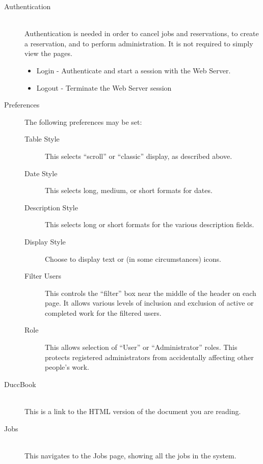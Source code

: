         \begin{description}
          \item[Authentication] \hfill \\ 
            Authentication is needed in order to cancel jobs and reservations, to create a
            reservation, and to perform administration. It is not required to simply view the pages.

            \begin{itemize}
              \item Login - Authenticate and start a session with the Web Server.             
              \item Logout - Terminate the Web Server session 
            \end{itemize}

          \item[Preferences]
            The following preferences may be set:
            \begin{description}
              \item[Table Style] This selects ``scroll'' or ``classic'' display, as
                described above.
              \item[Date Style] This selects long, medium, or short formats for dates.
              \item[Description Style] This selects long or short formats for the various
                description fields.
              \item[Display Style] Choose to display text or (in some circumstances) icons.
              \item[Filter Users] This controls the ``filter'' box near the middle of
                the header on each page.  It allows various levels of inclusion and
                exclusion of active or completed work for the filtered users.
              \item[Role] This allows selection of ``User'' or ``Administrator'' roles.
                This protects registered {\DUCC} administrators from accidentally affecting
                other people's work.
            \end{description}
            
          \item[DuccBook] \hfill \\
            This is a link to the HTML version of the document you are reading.

          \item[Jobs] \hfill \\
            This navigates to the Jobs page, showing all the jobs in the system.


\end{description}
